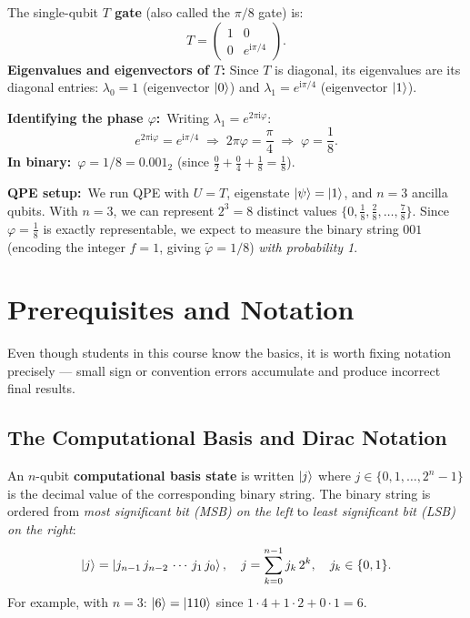\documentclass[12pt,a4paper]{article}
\newcommand{\QPE}{\textsc{QPE}}
\newcommand{\ii}{\mathrm{i}}
\begin{document}
\begin{tcolorbox}[example, title={Running Example: the $T$ Gate}]
  The single-qubit \textbf{$T$ gate} (also called the $\pi/8$ gate) is:
  \[
    T = \begin{pmatrix} 1 & 0 \\ 0 & e^{\ii\pi/4} \end{pmatrix}.
  \]
  \textbf{Eigenvalues and eigenvectors of $T$:}
  Since $T$ is diagonal, its eigenvalues are its diagonal entries:
  $\lambda_0 = 1$ (eigenvector $\Ket{0}$) and
  $\lambda_1 = e^{\ii\pi/4}$ (eigenvector $\Ket{1}$).

  \medskip
  \textbf{Identifying the phase $\varphi$:}\ Writing $\lambda_1 = e^{2\pi \ii \varphi}$:
  \[
    e^{2\pi \ii \varphi} = e^{\ii\pi/4}
    \;\Longrightarrow\;
    2\pi\varphi = \frac{\pi}{4}
    \;\Longrightarrow\;
    \varphi = \frac{1}{8}.
  \]
  \textbf{In binary:}\ $\varphi = 1/8 = 0.001_2$ (since $\frac{0}{2}+\frac{0}{4}+\frac{1}{8}=\frac{1}{8}$).

  \medskip
  \textbf{QPE setup:}\ We run \QPE{} with $U = T$, eigenstate $\Ket{\psi}=\Ket{1}$,
  and $n = 3$ ancilla qubits.  With $n=3$, we can represent $2^3=8$ distinct
  values $\{0, \tfrac{1}{8}, \tfrac{2}{8}, \ldots, \tfrac{7}{8}\}$.  Since
  $\varphi=\tfrac{1}{8}$ is exactly representable, we expect to measure
  the binary string $001$ (encoding the integer $f=1$, giving
  $\tilde\varphi = 1/8$) \emph{with probability 1}.
\end{tcolorbox}

\newpage

\section{Prerequisites and Notation}
\label{sec:prereqs}

Even though students in this course know the basics, it is worth fixing
notation precisely — small sign or convention errors accumulate and produce
incorrect final results.

\subsection{The Computational Basis and Dirac Notation}

An $n$-qubit \textbf{computational basis state} is written $\Ket{j}$ where
$j \in \{0,1,\ldots,2^n-1\}$ is the decimal value of the corresponding
binary string.  The binary string is ordered from \emph{most significant
bit (MSB) on the left} to \emph{least significant bit (LSB) on the right}:
\[
  \Ket{j} = \Ket{j_{n-1}\, j_{n-2}\, \cdots\, j_1\, j_0},
  \quad j = \sum_{k=0}^{n-1} j_k\, 2^k, \quad j_k \in \{0,1\}.
\]
For example, with $n=3$: $\Ket{6} = \Ket{110}$ since
$1\cdot4 + 1\cdot2 + 0\cdot1 = 6$.
\end{document}
